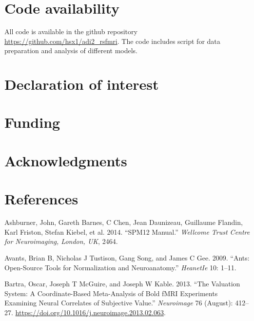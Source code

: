 \documentclass[
]{article}
\begin{document}
\hypertarget{code-availability}{%
\section{Code availability}\label{code-availability}}

All code is available in the github repository \url{https://github.com/hsx1/adi2_rsfmri}. The code includes script for data preparation and analysis of different models.

\hypertarget{declaration-of-interest}{%
\section{Declaration of interest}\label{declaration-of-interest}}

\hypertarget{funding}{%
\section{Funding}\label{funding}}

\hypertarget{acknowledgments}{%
\section{Acknowledgments}\label{acknowledgments}}

\newpage

\hypertarget{references}{%
\section*{References}\label{references}}

\hypertarget{refs}{}
\leavevmode\hypertarget{ref-spm12}{}%
Ashburner, John, Gareth Barnes, C Chen, Jean Daunizeau, Guillaume Flandin, Karl Friston, Stefan Kiebel, et al. 2014. ``SPM12 Manual.'' \emph{Wellcome Trust Centre for Neuroimaging, London, UK}, 2464.

\leavevmode\hypertarget{ref-avants2009ants}{}%
Avants, Brian B, Nicholas J Tustison, Gang Song, and James C Gee. 2009. ``Ants: Open-Source Tools for Normalization and Neuroanatomy.'' \emph{HeanetIe} 10: 1--11.

\leavevmode\hypertarget{ref-Bartra_2013}{}%
Bartra, Oscar, Joseph T McGuire, and Joseph W Kable. 2013. ``The Valuation System: A Coordinate-Based Meta-Analysis of Bold fMRI Experiments Examining Neural Correlates of Subjective Value.'' \emph{Neuroimage} 76 (August): 412--27. \url{https://doi.org/10.1016/j.neuroimage.2013.02.063}.
\end{document}
